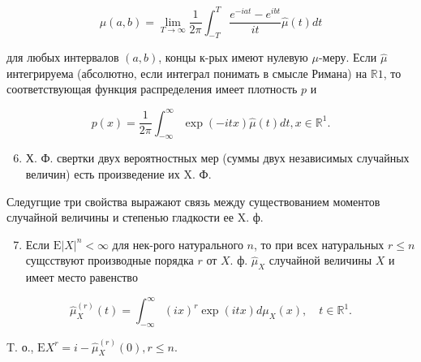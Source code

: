 \documentclass[10pt]{article}
\begin{document}
\[

\mu(a, b)=\lim _{T \rightarrow \infty} \frac{1}{2 \pi} \int_{-T}^{T} \frac{e^{-i a t}-e^{i b t}}{i t} \hat{\mu}(t) d t

\]



для любых интервалов $(a, b)$, концы к-рых имеют нулевую $\mu$-меру. Если $\hat{\mu}$ интегрируема (абсолютно, если интеграл понимать в смысле Римана) на $\mathbb{R} 1$, то соответствующая функция распределения имеет плотность $p$ и



\[

p(x)=\frac{1}{2 \pi} \int_{-\infty}^{\infty} \exp (-i t x) \hat{\mu}(t) d t, x \in \mathbb{R}^{1} .

\]



\begin{enumerate}

  \setcounter{enumi}{5}

  \item Х. Ф. свертки двух вероятностных мер (суммы двух независимых случайных величин) есть произведение их $\mathrm{X}$. Ф.

\end{enumerate}



Следугщие три свойства выражают связь между существованием моментов случайной величины и степенью гладкости ее X. ф.



\begin{enumerate}

  \setcounter{enumi}{6}

  \item Если $\mathrm{E}|X|^{n}<\infty$ для нек-рого натурального $n$, то при всех натуральных $r \leqslant n$ сущсствуют производные порядка $r$ от $X$. ф. $\hat{\mu}_{X}$ случайной величины $X$ и имеет место равенство

\end{enumerate}



\[

\hat{\mu}_{X}^{(r)}(t)=\int_{-\infty}^{\infty}(i x)^{r} \exp (i t x) d \mu_{X}(x), \quad t \in \mathbb{R}^{1} .

\]



T. о., $\mathrm{E} X^{r}=i-\hat{\mu}_{X}^{(r)}(0), r \leqslant n$.
\end{document}
